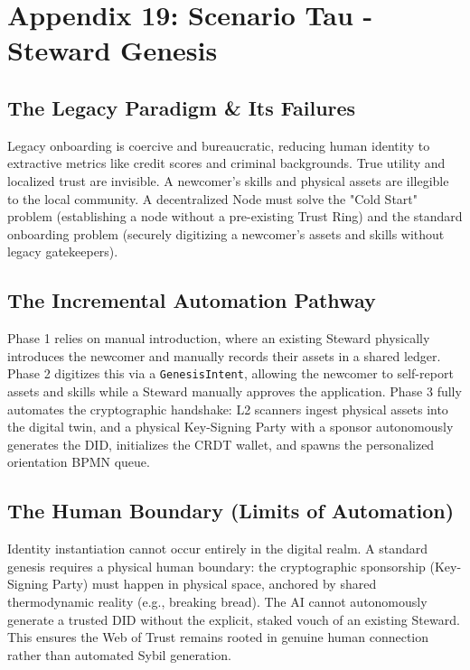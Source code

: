\chapter{Appendix 19: Scenario Tau - Steward Genesis}

\section{The Legacy Paradigm \& Its Failures}
Legacy onboarding is coercive and bureaucratic, reducing human identity to extractive metrics like credit scores and criminal backgrounds. True utility and localized trust are invisible. A newcomer's skills and physical assets are illegible to the local community. A decentralized Node must solve the "Cold Start" problem (establishing a node without a pre-existing Trust Ring) and the standard onboarding problem (securely digitizing a newcomer's assets and skills without legacy gatekeepers).

\section{The Incremental Automation Pathway}
Phase 1 relies on manual introduction, where an existing Steward physically introduces the newcomer and manually records their assets in a shared ledger. Phase 2 digitizes this via a \texttt{GenesisIntent}, allowing the newcomer to self-report assets and skills while a Steward manually approves the application. Phase 3 fully automates the cryptographic handshake: L2 scanners ingest physical assets into the digital twin, and a physical Key-Signing Party with a sponsor autonomously generates the DID, initializes the CRDT wallet, and spawns the personalized orientation BPMN queue.

\section{The Human Boundary (Limits of Automation)}
Identity instantiation cannot occur entirely in the digital realm. A standard genesis requires a physical human boundary: the cryptographic sponsorship (Key-Signing Party) must happen in physical space, anchored by shared thermodynamic reality (e.g., breaking bread). The AI cannot autonomously generate a trusted DID without the explicit, staked vouch of an existing Steward. This ensures the Web of Trust remains rooted in genuine human connection rather than automated Sybil generation.

